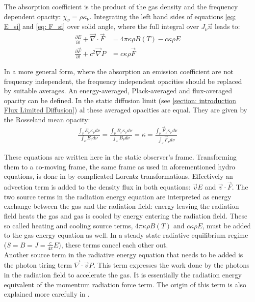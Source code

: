 The absorption coefficient is the product of the gas density and the frequency dependent opacity: $\chi_\nu = \rho \kappa_\nu$. Integrating the left hand sides of equations \ref{eq: E_si} and \ref{eq: F_si} over solid angle, where the full integral over $J_\nu \vec{n} $ leads to:
\begin{align}
\frac{\partial E}{\partial t} + \vec{\nabla} \cdot \vec{F} &= 4\pi \kappa\rho B(T) - c \kappa \rho E\\
\frac{\partial \vec{F}}{\partial t} + c^2 \vec{\nabla} P &=  c \kappa \rho \vec{F} 
\end{align}

In a more general form, where the absorption an emission coefficient are not frequency independent, the frequency independent opacities should be replaced by suitable averages. An energy-averaged, Plack-averaged and flux-averaged opacity can be defined. In the static diffusion limit (see \ref{section: introduction Flux Limited Diffusion}) al these averaged opacities are equal. They are given by the Rosseland mean opacity:
\begin{align}
\frac{\int_\nu E_\nu \kappa_\nu d\nu}{\int_\nu E_\nu d\nu} = \frac{\int_\nu B_\nu \kappa_\nu d\nu}{\int_\nu B_\nu d\nu} = \kappa = \frac{\int_\nu \vec{F}_\nu \kappa_\nu d\nu}{\int_\nu \vec{F}_\nu d\nu}
\end{align}

These equations are written here in the static observer's frame. Transforming them to a co-moving frame, the same frame as used in aforementioned hydro equations, is done in \citep{Mihalas1984a} by complicated Lorentz transformations. Effectively an advection term is added to the density flux in  both equations: $\vec{v} E$ and $\vec{v} \cdot \vec{F}$. The two source terms in the radiation energy equation are interpreted as energy exchange between the gas and the radiation field: energy leaving the radiation field heats the gas and gas is cooled by energy entering the radiation field. These so called heating and cooling source terms, $4\pi \kappa\rho B(T)$ and $ c \kappa \rho E$, must be added to the gas energy equation as well. In a steady state radiative equilibrium regime ($S = B = J = \frac{c}{4\pi}E$), these terms cancel each other out.\\

Another source term in the radiative energy equation that needs to be added is the photon tiring term $\vec{\nabla} \cdot \vec{v} P $. This term expresses the work done by the photons in the radiation field to accelerate the gas. It is essentially the radiation energy equivalent of the momentum radiation force term. The origin of this term is also explained more carefully in \citep{Mihalas1984a}. \\

